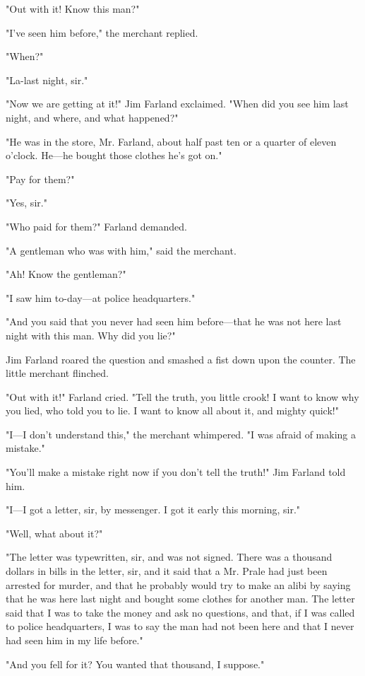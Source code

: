 \documentclass{novel}
\begin{document}
"Out with it! Know this man?"

"I've seen him before," the merchant replied.

"When?"

"La-last night, sir."

"Now we are getting at it!" Jim Farland exclaimed. "When did you see him last night, and where, and what happened?"

"He was in the store, Mr. Farland, about half past ten or a quarter of eleven o'clock. He---he bought those clothes he's got on."

"Pay for them?"

"Yes, sir."

"Who paid for them?" Farland demanded.

"A gentleman who was with him," said the merchant.

"Ah! Know the gentleman?"

"I saw him to-day---at police headquarters."

"And you said that you never had seen him before---that he was not here last night with this man. Why did you lie?"

Jim Farland roared the question and smashed a fist down upon the counter. The little merchant flinched.

"Out with it!" Farland cried. "Tell the truth, you little crook! I want to know why you lied, who told you to lie. I want to know all about it, and mighty quick!"

"I---I don't understand this," the merchant whimpered. "I was afraid of making a mistake."

"You'll make a mistake right now if you don't tell the truth!" Jim Farland told him.

"I---I got a letter, sir, by messenger. I got it early this morning, sir."

"Well, what about it?"

"The letter was typewritten, sir, and was not signed. There was a thousand dollars in bills in the letter, sir, and it said that a Mr. Prale had just been arrested for murder, and that he probably would try to make an alibi by saying that he was here last night and bought some clothes for another man. The letter said that I was to take the money and ask no questions, and that, if I was called to police headquarters, I was to say the man had not been here and that I never had seen him in my life before."

"And you fell for it? You wanted that thousand, I suppose."
\end{document}
